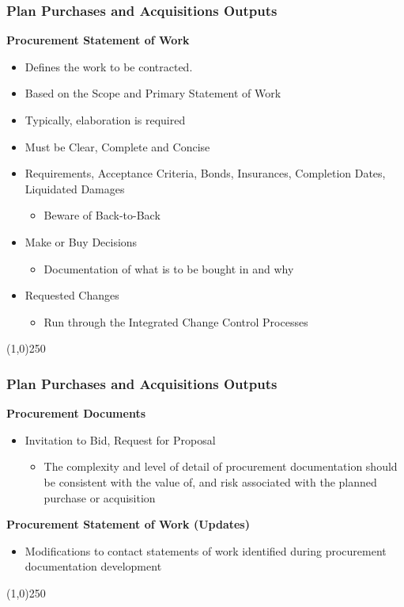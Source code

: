 \begin{frame}
\frametitle{Plan Purchases and Acquisitions \hfill\hfill Outputs}

\textbf{Procurement Statement of Work}\\
		\begin{itemize}
		\item Defines the work to be contracted.
		\item Based on the Scope and Primary Statement of Work
		\item Typically, elaboration is required
		\item Must be Clear, Complete and Concise
		\item Requirements, Acceptance Criteria, Bonds, Insurances, Completion Dates, Liquidated Damages
			\begin{itemize}
			\item Beware of Back-to-Back
			\end{itemize}

\item Make or Buy Decisions
		\begin{itemize}
		\item Documentation of what is to be bought in and why
		\end{itemize}
\item Requested Changes
		\begin{itemize}
		\item Run through the Integrated Change Control Processes
		\end{itemize}
\end{itemize}		
\end{frame}\begin{center}\line(1,0){250}\end{center}



\begin{frame}
\frametitle{Plan Purchases and Acquisitions \hfill\hfill Outputs}

\textbf{Procurement Documents}\\
\begin{itemize}
\item Invitation to Bid, Request for Proposal
\begin{itemize}
\item The complexity and level of detail of procurement documentation should be consistent with the value of, and risk associated with the planned purchase or acquisition
\end{itemize} 
\end{itemize}

\textbf{Procurement Statement of Work (Updates)}
	\begin{itemize}
	\item Modifications to contact statements of work identified during procurement documentation development
	\end{itemize}
\end{frame}\begin{center}\line(1,0){250}\end{center}



